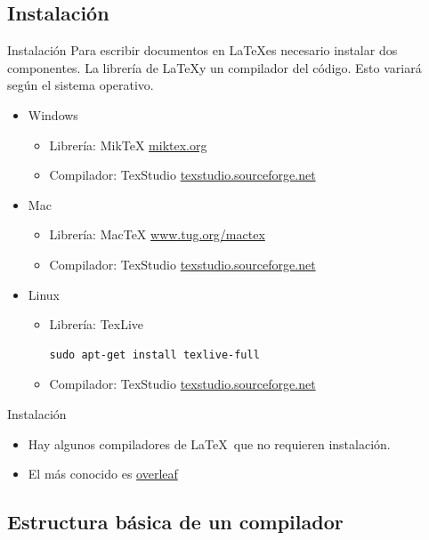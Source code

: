 \documentclass[dvipsnames,xcolor, handout]{beamer}
\theoremstyle{plain}
\theoremstyle{definition}
\begin{document}
\subsection{Instalación}
\begin{frame}[fragile]{Instalación}
Para escribir documentos en \LaTeX es necesario instalar dos componentes. La librería de \LaTeX y un compilador del código. Esto variará según el sistema operativo.

\begin{itemize}
    \item Windows
    \begin{itemize}
        \item Librería: MikTeX \href{http://miktex.org/download}{miktex.org}
        \item Compilador: TexStudio \href{http://texstudio.sourceforge.net/}{texstudio.sourceforge.net}
    \end{itemize}
    \item Mac
    \begin{itemize}
        \item Librería: MacTeX \href{http://www.tug.org/mactex/index.html}{www.tug.org/mactex}
        \item Compilador: TexStudio \href{http://texstudio.sourceforge.net/}{texstudio.sourceforge.net}
    \end{itemize}
    \item Linux
    \begin{itemize}
        \item Librería: TexLive \begin{verbatim}sudo apt-get install texlive-full\end{verbatim}
        \item Compilador: TexStudio \href{http://texstudio.sourceforge.net/}{texstudio.sourceforge.net}
    \end{itemize}
\end{itemize}
\end{frame}

\begin{frame}{Instalación}
\begin{itemize}
    \item Hay algunos compiladores de \LaTeX\ que no requieren instalación.
    \item El más conocido es \href{http://overleaf.com}{overleaf}
\end{itemize}
\end{frame}

\subsection{Estructura básica de un compilador}
\end{document}
